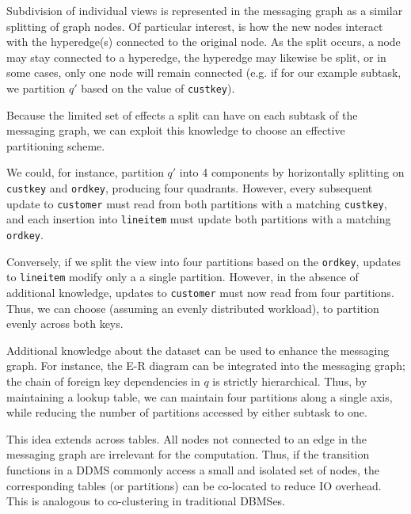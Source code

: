 Subdivision of individual views is represented in the messaging graph as a similar splitting of graph nodes.  Of particular interest, is how the new nodes interact with the hyperedge(s) connected to the original node.  As the split occurs, a node may stay connected to a hyperedge, the hyperedge may likewise be split, or in some cases, only one node will remain connected (e.g. if for our example subtask, we partition $q'$ based on the value of \texttt{custkey}).

Because the limited set of effects a split can have on each subtask of the messaging graph, we can exploit this knowledge to choose an effective partitioning scheme.

We could, for instance, partition $q'$ into 4 components by horizontally splitting on \texttt{custkey} and \texttt{ordkey}, producing four quadrants.  However, every subsequent update to \texttt{customer} must read from both partitions with a matching \texttt{custkey}, and each insertion into \texttt{lineitem} must update both partitions with a matching \texttt{ordkey}.  

Conversely, if we split the view into four partitions based on the \texttt{ordkey}, updates to \texttt{lineitem} modify only a a single partition.  However, in the absence of additional knowledge, updates to \texttt{customer} must now read from four partitions.  Thus, we can choose (assuming an evenly distributed workload), to partition evenly across both keys.

Additional knowledge about the dataset can be used to enhance the messaging graph.  For instance, the E-R diagram can be integrated into the messaging graph; the chain of foreign key dependencies in $q$ is strictly hierarchical.  Thus, by maintaining a lookup table, we can maintain four partitions along a single axis, while reducing the number of partitions accessed by either subtask to one.

This idea extends across tables.  All nodes not connected to an edge in the messaging graph are irrelevant for the computation.  Thus, if the transition functions in a DDMS commonly access a small and isolated set of nodes, the corresponding tables (or partitions) can be co-located to reduce IO overhead.  This is analogous to co-clustering in traditional DBMSes.


